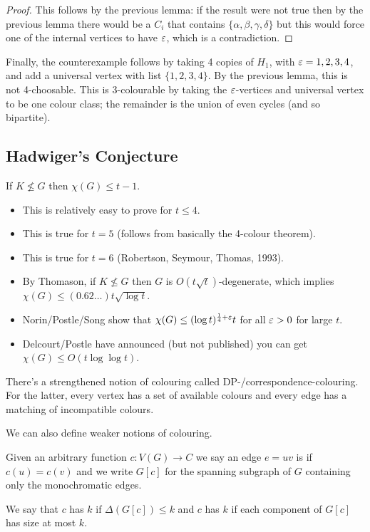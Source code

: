 \documentclass[main.tex]{subfiles}
\begin{document}
\begin{proof}
  This follows by the previous lemma: if the result were not true then by the
  previous lemma there would be a $C_i$ that contains
  $\{\alpha,\beta,\gamma,\delta\}$ but this would force one of the internal
  vertices to have $\varepsilon$, which is a contradiction.
\end{proof}
Finally, the counterexample follows by taking 4 copies of $H_1$,
with $\varepsilon = 1, 2, 3, 4$, and add a universal vertex with list $\{1,2,3,4\}$.
By the previous lemma, this is not 4-choosable.
This is 3-colourable by taking the $\varepsilon$-vertices and universal vertex to be
one colour class; the remainder is the union of even cycles (and so bipartite).
\subsection{Hadwiger's Conjecture}%
\begin{conjecture}
  If $K\not\leq G$ then $\chi(G)\leq t-1$.
\end{conjecture}
\begin{itemize}
  \item This is relatively easy to prove for $t\leq 4$.
  \item This is true for $t = 5$ (follows from basically the 4-colour theorem).
  \item This is true for $t = 6$ (Robertson, Seymour, Thomas, 1993).
  \item By Thomason, if $K\not\leq G$ then $G$ is $O(t\sqrt t)$-degenerate,
    which implies $\chi(G)\leq(0.62\ldots)t\sqrt{\log t}$.
  \item Norin/Postle/Song show that $\chi(G)\leq(\log t)^{\frac 1 4 + \varepsilon} t$
    for all $\varepsilon > 0$ for large $t$.
  \item Delcourt/Postle have announced (but not published) you can get
    $\chi(G)\leq O(t\log\log t)$.
\end{itemize}
\begin{remark*}
  There's a strengthened notion of colouring called DP-/correspondence-colouring.
  For the latter, every vertex has a set of available colours and every edge
  has a matching of incompatible colours.
\end{remark*}
We can also define weaker notions of colouring.
\begin{definition*}
  Given an arbitrary function $c:V(G)\to C$ we say an edge $e = uv$ is
   if $c(u) = c(v)$ and we write $G[c]$ for the spanning
  subgraph of $G$ containing only the monochromatic edges.

  We say that $c$ has  $k$ if $\Delta(G[c])\leq k$ and $c$ has
   $k$ if each component of $G[c]$ has size at most $k$.
\end{definition*}
\end{document}
